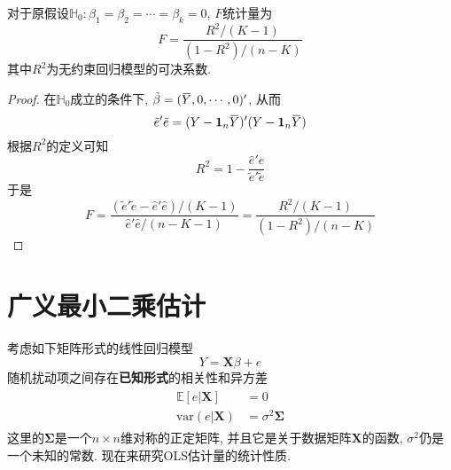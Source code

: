 \documentclass[cn, 12pt, math=mtpro2, bibstyle=apa, blue, twocol]{elegantbook}
\newcommand{\E}{\mathbb{E}}
\newcommand{\var}{\text{var}}
\newcommand{\X}{\mathbold{X}}
\newcommand{\HH}{\mathbb{H}}
\newcommand{\overbar}[1]{\mkern 1.5mu\overline{\mkern-1.5mu#1\mkern-1.5mu}\mkern 1.5mu}
\begin{document}
\begin{corollary}\label{cor:cor2.2}
对于原假设$\HH_0: \beta_1=\beta_2=\cdots=\beta_k=0$, $F$统计量为
$$F=\frac{R^2/(K-1)}{(1-R^2)/(n-K)}$$
其中$R^2$为无约束回归模型的可决系数.
\end{corollary}
\begin{proof}
  在$\HH_0$成立的条件下, $\tilde{\beta}=(\overbar{Y},0,\cdots,0)'$, 从而
  $$\tilde{e}'\tilde{e}=(Y-\mathbf{1}_n\overbar{Y})'(Y-\mathbf{1}_n\overbar{Y})$$
  根据$R^2$的定义可知
  $$R^2=1-\frac{\hat{e}'\hat{e}}{\tilde{e}'\tilde{e}}$$
  于是
  $$F=\frac{(\tilde{e}'\tilde{e}-\hat{e}'\hat{e})/(K-1)}{\hat{e}'\hat{e}/(n-K-1)}=\frac{R^2/(K-1)}{(1-R^2)/(n-K)}$$
\end{proof}

\section{广义最小二乘估计}
考虑如下矩阵形式的线性回归模型
\begin{equation}\label{eq2.13}
  Y=\X\beta+e
\end{equation}
随机扰动项之间存在\textbf{已知形式}的相关性和异方差
\begin{align}
\begin{split}
\E[e|\X]&=0 \\
\var(e|\X)&=\sigma^2\mathbold{\Sigma}
\end{split}
\label{eq2.12}
\end{align}
这里的$\mathbold{\Sigma}$是一个$n\times n$维对称的正定矩阵, 并且它是关于数据矩阵$\X$的函数, $\sigma^2$仍是一个未知的常数. 现在来研究OLS估计量的统计性质.
\end{document}
